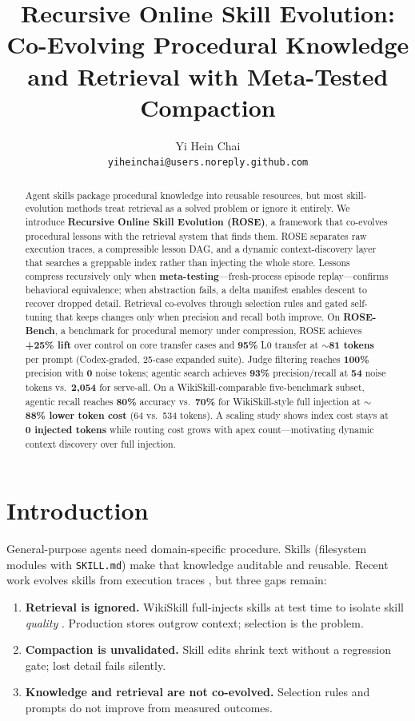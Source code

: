 \documentclass[11pt]{article}
\title{Recursive Online Skill Evolution: Co-Evolving Procedural Knowledge and Retrieval with Meta-Tested Compaction}
\author{
  Yi Hein Chai \\
  \texttt{yiheinchai@users.noreply.github.com}
}
\begin{document}
\maketitle

\begin{abstract}
Agent skills package procedural knowledge into reusable resources, but most skill-evolution methods treat retrieval as a solved problem or ignore it entirely.
We introduce \textbf{Recursive Online Skill Evolution (ROSE)}, a framework that co-evolves procedural lessons with the retrieval system that finds them.
ROSE separates raw execution traces, a compressible lesson DAG, and a dynamic context-discovery layer that searches a greppable index rather than injecting the whole store.
Lessons compress recursively only when \textbf{meta-testing}---fresh-process episode replay---confirms behavioral equivalence; when abstraction fails, a delta manifest enables descent to recover dropped detail.
Retrieval co-evolves through selection rules and gated self-tuning that keeps changes only when precision and recall both improve.
On \textbf{ROSE-Bench}, a benchmark for procedural memory under compression, ROSE achieves \textbf{+25\% lift} over control on core transfer cases and \textbf{95\%} L0 transfer at \textbf{$\sim$81 tokens} per prompt (Codex-graded, 25-case expanded suite).
Judge filtering reaches \textbf{100\%} precision with \textbf{0} noise tokens; agentic search achieves \textbf{93\%} precision/recall at \textbf{54} noise tokens vs.\ \textbf{2,054} for serve-all.
On a WikiSkill-comparable five-benchmark subset, agentic recall reaches \textbf{80\%} accuracy vs.\ \textbf{70\%} for WikiSkill-style full injection at \textbf{$\sim$88\% lower token cost} (64 vs.\ 534 tokens).
A scaling study shows index cost stays at \textbf{0 injected tokens} while routing cost grows with apex count---motivating dynamic context discovery over full injection.
\end{abstract}

\section{Introduction}
\label{sec:intro}

General-purpose agents need domain-specific procedure.
Skills (filesystem modules with \texttt{SKILL.md}) make that knowledge auditable and reusable.
Recent work evolves skills from execution traces \citep{wikiskill2026,wang2023voyager,shinn2023reflexion}, but three gaps remain:

\begin{enumerate}
  \item \textbf{Retrieval is ignored.} WikiSkill full-injects skills at test time to isolate skill \emph{quality} \citep{wikiskill2026}.
    Production stores outgrow context; selection is the problem.
  \item \textbf{Compaction is unvalidated.} Skill edits shrink text without a regression gate; lost detail fails silently.
  \item \textbf{Knowledge and retrieval are not co-evolved.} Selection rules and prompts do not improve from measured outcomes.
\end{enumerate}
\end{document}
